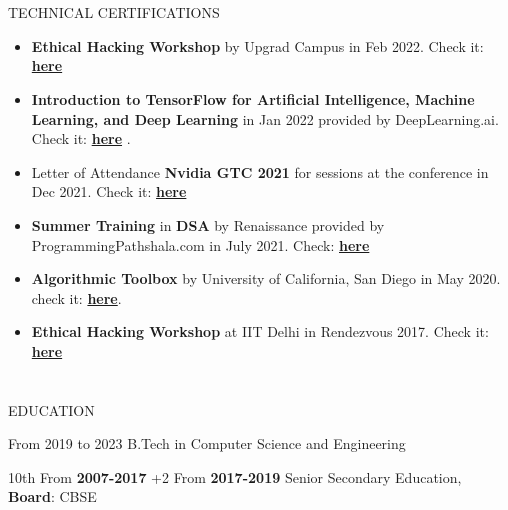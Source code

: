 \documentclass{my_cv}
\begin{document}
\begin{multicols}{2}
\section{\faPaintBrush}{TECHNICAL CERTIFICATIONS}
\begin{itemize}[noitemsep]
    \item \textbf{Ethical Hacking Workshop} by Upgrad Campus in Feb 2022. Check it: \textbf{\href{https://www.credential.net/90177f72-2c1d-4c6c-a2c1-5f0fab5d1319}{here}}
    \item \textbf{Introduction to TensorFlow for Artificial Intelligence, Machine Learning, and Deep Learning} in Jan 2022 provided by DeepLearning.ai. Check it: \textbf{\href{https://www.coursera.org/account/accomplishments/certificate/H8WRJYD4T2BQ}{here}} .
    \par
    \item Letter of Attendance\textbf{ Nvidia GTC 2021} for sessions at the conference in Dec 2021.
    Check it: \textbf{\href{https://drive.google.com/file/d/16Tgme1Sr4KLjh2kWmrEXJBxSxgiaxqPo/view}{here}}
    \par
    \item \textbf{Summer Training} in \textbf{DSA} by Renaissance provided by ProgrammingPathshala.com in July 2021. Check: \textbf{\href{https://drive.google.com/file/d/1mEDQhzi45hriBOnNocF9JVuJe5caTsaX/view}{here}}
    \par
    \item \textbf{Algorithmic Toolbox} by University of California, San Diego in May 2020. check it: \textbf{\href{https://www.coursera.org/account/accomplishments/certificate/7TUG86DARH68}{here}}.
    \par
    \item \textbf{Ethical Hacking Workshop} at IIT Delhi in Rendezvous 2017. Check it: \textbf{\href{https://drive.google.com/file/d/1I0uNqQeMgE7rf2xn4YXI0yu-UilRbEui/view}{here}}
   
\end{itemize}

\section{\faGraduationCap}{EDUCATION}
    
{From 2019 to 2023} %
{B.Tech in Computer Science and Engineering}
    
{ 10th  From \textbf{ 2007-2017 } +2 From \textbf{ 2017-2019 }} 
{Senior Secondary Education, \textbf{Board}: CBSE }


\end{multicols}
\end{document}
